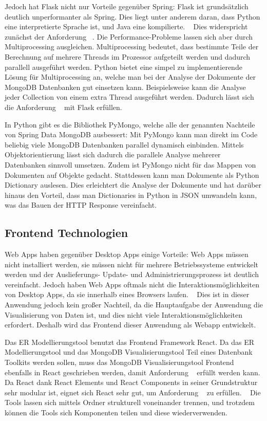 Jedoch hat Flask nicht nur Vorteile gegenüber Spring:
Flask ist grundsätzlich deutlich unperformanter als Spring.
Dies liegt unter anderem daran, dass Python eine interpretierte Sprache ist, und Java eine kompilierte.
~\autocite{sverker:rest_comparison}
Dies widerspricht zunächst der Anforderung ~.
Die Performance-Probleme lassen sich aber durch Multiprocessing ausgleichen.
Multiprocessing bedeutet, dass bestimmte Teile der Berechnung auf mehrere Threads im Prozessor aufgeteilt werden und dadurch parallell ausgeführt werden.
Python bietet eine simpel zu implementierende Lösung für Multiprocessing an, welche man bei der Analyse der Dokumente der MongoDB Datenbanken gut einsetzen kann.
Beispielsweise kann die Analyse jeder Collection von einem extra Thread ausgeführt werden.
Dadurch lässt sich die Anforderung ~ mit Flask erfüllen.

In Python gibt es die Bibliothek PyMongo, welche alle der genannten Nachteile von Spring Data MongoDB ausbessert:
Mit PyMongo kann man direkt im Code beliebig viele MongoDB Datenbanken parallel dynamisch einbinden.
Mittels Objektorientierung lässt sich dadurch die parallele Analyse mehrerer Datenbanken sinnvoll umsetzen.
Zudem ist PyMongo nicht für das Mappen von Dokumenten auf Objekte gedacht.
Stattdessen kann man Dokumente als Python Dictionary auslesen.
Dies erleichtert die Analyse der Dokumente und hat darüber hinaus den Vorteil, dass man Dictionaries in Python in JSON umwandeln kann, was das Bauen der HTTP Response vereinfacht.
~\autocite{mongodb:pymongo}

\subsection{Frontend Technologien}
\label{sec:verwendete_technologien_frontend}

Web Apps haben gegenüber Desktop Apps einige Vorteile:
Web Apps müssen nicht installiert werden, sie müssen nicht für mehrere Betriebssysteme entwickelt werden und der Auslieferungs- Update- und Administrierungsprozess ist deutlich vereinfacht.
Jedoch haben Web Apps oftmals nicht die Interaktionsmöglichkeiten von Desktop Apps, da sie innerhalb eines Browsers laufen.
~\autocite{zepeda2007desktop}
Dies ist in dieser Anwendung jedoch kein großer Nachteil, da die Hauptaufgabe der Anwendung die Visualisierung von Daten ist, und dies nicht viele Interaktionsmöglichkeiten erfordert.
Deshalb wird das Frontend dieser Anwendung als Webapp entwickelt.

Das ER Modellierungstool benutzt das Frontend Framework React.
Da das ER Modellierungstool und das MongoDB Visualisierungstool Teil eines Datenbank Toolkits werden sollen, muss das MongoDB Visualisierungstool Frontend ebenfalls in React geschrieben werden, damit Anforderung ~ erfüllt werden kann.
Da React dank React Elements und React Components in seiner Grundstruktur  sehr modular ist, eignet sich React sehr gut, um Anforderung ~ zu erfüllen.
~\autocite{banks:react}
Die Tools lassen sich mittels Ordner strukturell voneinander trennen, und trotzdem können die Tools sich Komponenten teilen und diese wiederverwenden.

